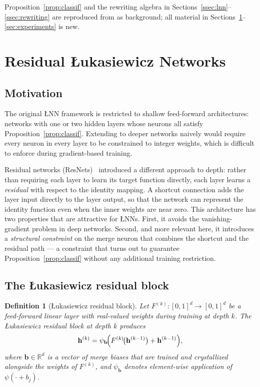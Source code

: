 \documentclass[12pt,a4paper]{article}
\newtheorem{definition}[theorem]{Definition}
\newcommand{\LNN}{\L{}NN}
\begin{document}
Proposition~\ref{prop:classif} and the rewriting algebra in
Sections~\ref{ssec:lnn}--\ref{ssec:rewriting} are reproduced from
\cite{leandro2009} as background; all material in
Sections~\ref{sec:residual}--\ref{sec:experiments} is new.

\section{Residual \L{}ukasiewicz Networks}
\label{sec:residual}

\subsection{Motivation}
\label{ssec:res_motiv}

The original \LNN{} framework is restricted to shallow feed-forward
architectures: networks with one or two hidden layers whose neurons all satisfy
Proposition~\ref{prop:classif}.
Extending to deeper networks naively would require every neuron in every layer
to be constrained to integer weights, which is difficult to enforce during
gradient-based training.

Residual networks (ResNets)~\cite{he2016} introduced a different approach to
depth: rather than requiring each layer to learn its target function directly,
each layer learns a \emph{residual} with respect to the identity mapping.
A shortcut connection adds the layer input directly to the layer output,
so that the network can represent the identity function even when the inner
weights are near zero.
This architecture has two properties that are attractive for \LNN{}s.
First, it avoids the vanishing-gradient problem in deep networks.
Second, and more relevant here, it introduces a \emph{structural constraint}
on the merge neuron that combines the shortcut and the residual path
--- a constraint that turns out to guarantee Proposition~\ref{prop:classif}
without any additional training restriction.

\subsection{The \L{}ukasiewicz residual block}
\label{ssec:res_block}

\begin{definition}[\L{}ukasiewicz residual block]
\label{def:resblock}
Let $F^{(k)}\colon [0,1]^d \to [0,1]^d$ be a feed-forward linear layer
with real-valued weights during training at depth $k$.
The \emph{\L{}ukasiewicz residual block} at depth $k$ produces
\begin{equation}
  \mathbf{h}^{(k)} = \psi_{\mathbf{b}}\!\Bigl(
    F^{(k)}\!\bigl(\mathbf{h}^{(k-1)}\bigr)
    + \mathbf{h}^{(k-1)}
  \Bigr),
  \label{eq:resblock}
\end{equation}
where $\mathbf{b} \in \mathbb{R}^d$ is a vector of \emph{merge biases} that
are trained and crystallized alongside the weights of $F^{(k)}$, and
$\psi_{\mathbf{b}}$ denotes element-wise application of $\psi(\cdot + b_j)$.
\end{definition}
\end{document}
